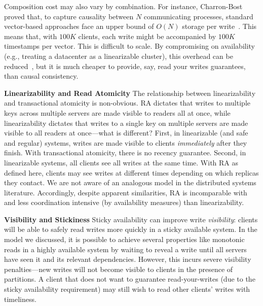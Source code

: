 Composition cost may also vary by combination. For instance, Charron-Bost
 proved that, to capture causality between $N$ communicating
processes, standard vector-based approaches face an upper bound of
$O(N)$ storage per write~\cite{charron-bost}. This means that, with
$100K$ clients, each write might be accompanied by $100K$ timestamps
per vector. This is difficult to scale. By compromising on
availability (e.g., treating a datacenter as a linearizable cluster),
this overhead can be reduced~\cite{eiger}, but it is much
cheaper to provide, say, read your writes guarantees, than causal
consistency.

\vspace{.5em}\noindent\textbf{Linearizability and Read
  Atomicity} The relationship between linearizability and
transactional atomicity is non-obvious. RA dictates that writes to
multiple keys across multiple servers are made visible to readers all
at once, while linearizability dictates that writes to a single key on
multiple servers are made visible to all readers at once---what is
different? First, in linearizable (and safe and regular) systems,
writes are made visible to clients \textit{immediately} after they
finish. With transactional atomicity, there is no recency
guarantee. Second, in linearizable systems, all clients see all writes
at the same time. With RA as defined here, clients may see writes at
different times depending on which replicas they contact. We are not
aware of an analogous model in the distributed systems
literature. Accordingly, despite apparent similarities, RA is
incomparable with and less coordination intensive (by availability
measures) than linearizability.

\vspace{.5em}\noindent\textbf{Visibility and Stickiness} Sticky
availability can improve write \textit{visibility}: clients will be
able to safely read writes more quickly in a sticky available
system. In the model we discussed, it is possible to achieve several
properties like monotonic reads in a highly available system by
waiting to reveal a write until all servers have seen it and its
relevant dependencies. However, this incurs severe visibility
penalties---new writes will not become visible to clients in the
presence of partitions. A client that does not want to guarantee
read-your-writes (due to the sticky availability requirement) may
still wish to read other clients' writes with timeliness.
